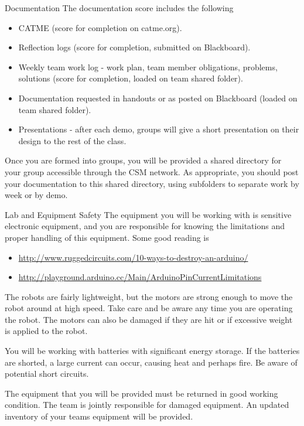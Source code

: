 \begin{frame}{Documentation}
The documentation score includes the following
\begin{itemize}
\item CATME (score for completion on catme.org).
\item Reflection logs (score for completion, submitted on Blackboard).
\item Weekly team work log - work plan, team member obligations, problems, solutions (score for completion, loaded on team shared folder).
\item Documentation requested in handouts or as posted on Blackboard (loaded on team shared folder).
\item Presentations - after each demo, groups will give a short presentation on their design to the rest of the class.
\end{itemize}
Once you are formed into groups, you will be provided a shared directory for your group accessible through the CSM network. As appropriate, you should post your documentation to this shared directory, using subfolders to separate work by week or by demo.  
\end{frame}

\begin{frame}{Lab and Equipment Safety}
The equipment you will be working with is sensitive electronic equipment, and you are responsible for knowing the limitations and proper handling of this equipment. Some good reading is
\begin{itemize}
\item \url{http://www.ruggedcircuits.com/10-ways-to-destroy-an-arduino/}
\item \url{http://playground.arduino.cc/Main/ArduinoPinCurrentLimitations}
\end{itemize}

The robots are fairly lightweight, but the motors are strong enough to move the robot around at high speed. Take care and be aware any time you are operating the robot. The motors can also be damaged if they are hit or if excessive weight is applied to the robot. 

You will be working with batteries with significant energy storage. If the batteries are shorted, a large current can occur, causing heat and perhaps fire. Be aware of potential short circuits.

The equipment that you will be provided must be returned in good working condition. The team is jointly responsible for damaged equipment. An updated inventory of your teams equipment will be provided.  
\end{frame}

